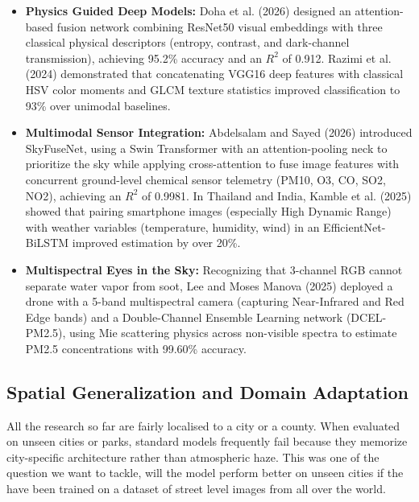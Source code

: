 \documentclass[conference]{IEEEtran}
\begin{document}
\begin{itemize}
  \item \textbf{Physics Guided Deep Models:} Doha et al.
        (2026)\cite{dohaDeepMultiTaskLearning2026} designed an attention-based
        fusion network combining ResNet50 visual embeddings with three classical
        physical descriptors (entropy, contrast, and dark-channel transmission),
        achieving 95.2\% accuracy and an $R^2$ of 0.912. Razimi et al.
        (2024)\cite{razimiIntegratingDeepLearning2024a} demonstrated that
        concatenating VGG16 deep features with classical HSV color moments and
        GLCM texture statistics improved classification to 93\% over unimodal
        baselines.
  \item \textbf{Multimodal Sensor Integration:} Abdelsalam and Sayed
        (2026)\cite{abdelsalamSkyFuseNetCrossAttentionSwin2026} introduced
        SkyFuseNet, using a Swin Transformer with an attention-pooling neck to
        prioritize the sky while applying cross-attention to fuse image features
        with concurrent ground-level chemical sensor telemetry (PM10, O3, CO,
        SO2, NO2), achieving an $R^2$ of 0.9981. In Thailand and India, Kamble
        et al. (2025)\cite{kambleMobileImageDrivenPM252025} showed that pairing
        smartphone images (especially High Dynamic Range) with weather variables
        (temperature, humidity, wind) in an EfficientNet-BiLSTM improved
        estimation by over 20\%.
  \item \textbf{Multispectral Eyes in the Sky:} Recognizing that 3-channel RGB
        cannot separate water vapor from soot, Lee and Moses Manova
        (2025)\cite{leeEnhancingPM25Detection2025} deployed a drone with a
        5-band multispectral camera (capturing Near-Infrared and Red Edge bands)
        and a Double-Channel Ensemble Learning network (DCEL-PM2.5), using Mie
        scattering physics across non-visible spectra to estimate PM2.5
        concentrations with 99.60\% accuracy.
\end{itemize}

\subsection{Spatial Generalization and Domain Adaptation}

All the research so far are fairly localised to a city or a county. When
evaluated on unseen cities or parks, standard models frequently fail because
they memorize city-specific architecture rather than atmospheric haze. This was
one of the question we want to tackle, will the model perform better on unseen
cities if the have been trained on a dataset of street level images from all
over the world.
\end{document}
